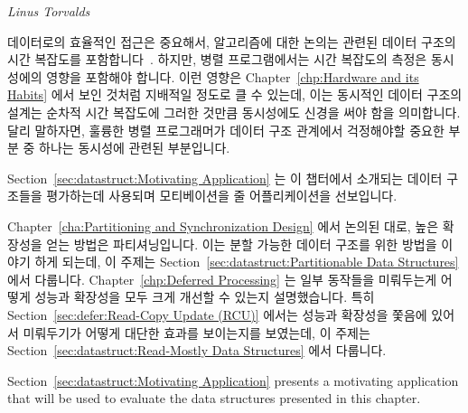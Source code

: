 
%
	 {\emph{Linus Torvalds}}

데이터로의 효율적인 접근은 중요해서, 알고리즘에 대한 논의는 관련된 데이터
구조의 시간 복잡도를 포함합니다~\cite{ThomasHCorman2001Algorithms}.
하지만, 병렬 프로그램에서는 시간 복잡도의 측정은 동시성에의 영향을 포함해야
합니다.
이런 영향은 Chapter~\ref{chp:Hardware and its Habits} 에서 보인 것처럼 지배적일
정도로 클 수 있는데, 이는 동시적인 데이터 구조의 설계는 순차적 시간 복잡도에
그러한 것만큼 동시성에도 신경을 써야 함을 의미합니다.
달리 말하자면, 훌륭한 병렬 프로그래머가 데이터 구조 관계에서 걱정해야할 중요한
부분 중 하나는 동시성에 관련된 부분입니다.

Section~\ref{sec:datastruct:Motivating Application}
는 이 챕터에서 소개되는 데이터 구조들을 평가하는데 사용되며 모티베이션을 줄
어플리케이션을 선보입니다.

Chapter~\ref{cha:Partitioning and Synchronization Design} 에서 논의된 대로,
높은 확장성을 얻는 방법은 파티셔닝입니다.
이는 분할 가능한 데이터 구조를 위한 방법을 이야기 하게 되는데, 이 주제는
Section~\ref{sec:datastruct:Partitionable Data Structures} 에서 다룹니다.
Chapter~\ref{chp:Deferred Processing} 는 일부 동작들을 미뤄두는게 어떻게 성능과
확장성을 모두 크게 개선할 수 있는지 설명했습니다.
특히 Section~\ref{sec:defer:Read-Copy Update (RCU)} 에서는 성능과 확장성을
쫓음에 있어서 미뤄두기가 어떻게 대단한 효과를 보이는지를 보였는데, 이 주제는
Section~\ref{sec:datastruct:Read-Mostly Data Structures} 에서 다룹니다.
\iffalse

Section~\ref{sec:datastruct:Motivating Application}
presents a motivating application that will be used to evaluate
the data structures presented in this chapter.

